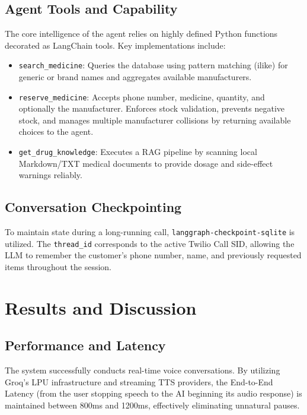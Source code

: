 \documentclass[12pt,a4paper]{report}
\begin{document}
\section{Agent Tools and Capability}
The core intelligence of the agent relies on highly defined Python functions decorated as LangChain tools. Key implementations include:
\begin{itemize}
    \item \texttt{search\_medicine}: Queries the database using pattern matching (ilike) for generic or brand names and aggregates available manufacturers.
    \item \texttt{reserve\_medicine}: Accepts phone number, medicine, quantity, and optionally the manufacturer. Enforces stock validation, prevents negative stock, and manages multiple manufacturer collisions by returning available choices to the agent.
    \item \texttt{get\_drug\_knowledge}: Executes a RAG pipeline by scanning local Markdown/TXT medical documents to provide dosage and side-effect warnings reliably.
\end{itemize}

\section{Conversation Checkpointing}
To maintain state during a long-running call, \texttt{langgraph-checkpoint-sqlite} is utilized. The \texttt{thread\_id} corresponds to the active Twilio Call SID, allowing the LLM to remember the customer's phone number, name, and previously requested items throughout the session.

\chapter{Results and Discussion}

\section{Performance and Latency}
The system successfully conducts real-time voice conversations. By utilizing Groq's LPU infrastructure and streaming TTS providers, the End-to-End Latency (from the user stopping speech to the AI beginning its audio response) is maintained between 800ms and 1200ms, effectively eliminating unnatural pauses.
\end{document}
